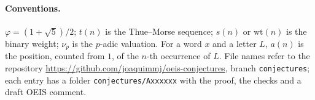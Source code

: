 \paragraph{Conventions.} $\varphi=(1+\sqrt5)/2$; $t(n)$ is the Thue--Morse sequence; $s(n)$ or
$\mathrm{wt}(n)$ is the binary weight; $\nu_p$ is the $p$-adic valuation. For a word $x$ and a letter $L$,
$a(n)$ is the position, counted from $1$, of the $n$-th occurrence of $L$. File names refer to the
repository \url{https://github.com/joaquimmj/oeis-conjectures}, branch \texttt{conjectures}; each entry has a
folder \texttt{conjectures/Axxxxxx} with the proof, the checks and a draft OEIS comment.
